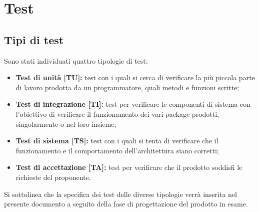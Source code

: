 \newpage
\section{Test}
	\subsection{Tipi di test}
	Sono stati individuati quattro tipologie di test:
	\begin{itemize}
		\item \textbf{Test di unità [TU]:} test con i quali si cerca di verificare la più piccola parte di lavoro prodotta da un programmatore, quali metodi e funzioni scritte;
		\item \textbf{Test di integrazione [TI]:} test per verificare le componenti di sistema con l'obiettivo di verificare il funzionamento dei vari package prodotti, singolarmente o nel loro insieme;
		\item \textbf{Test di sistema [TS]:} test con i quali si tenta di verificare che il funzionamento e il comportamento dell'architettura siano corretti;
		\item \textbf{Test di accettazione [TA]:} test per verificare che il prodotto soddisfi le richieste del proponente.
	\end{itemize}
	Si sottolinea che la specifica dei test delle diverse tipologie verrà inserita nel presente documento a seguito della fase di progettazione del prodotto in esame.

